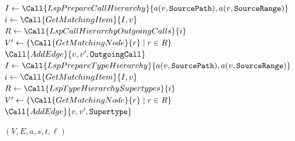 \documentclass{scrartcl}
\begin{document}
{\begin{algorithm}
\begin{algorithmic}[1]
        \State $I \gets \Call{LspPrepareCallHierarchy}{a(v, \texttt{SourcePath}), a(v, \texttt{SourceRange})}$
        \State $i \gets \Call{GetMatchingItem}{I, v}$
        \State $R \gets \Call{LspCallHierarchyOutgoingCalls}{i}$
        \State $V' \gets \{\Call{GetMatchingNode}{r} \mid r \in R\}$
          \State $\Call{AddEdge}{v, v', \texttt{OutgoingCall}}$
        \EndFor
        \State $I \gets \Call{LspPrepareTypeHierarchy}{a(v, \texttt{SourcePath}), a(v, \texttt{SourceRange})}$
        \State $i \gets \Call{GetMatchingItem}{I, v}$
        \State $R \gets \Call{LspTypeHierarchySupertypes}{i}$
        \State $V' \gets \{\Call{GetMatchingNode}{r} \mid r \in R\}$
          \State $\Call{AddEdge}{v, v', \texttt{Supertype}}$
        \EndFor
      \EndIf{}
    \EndFor


    \State \Return $(V, E, a, s, t, \ell)$

    \Statex
  \end{algorithmic}
\end{algorithm}

}
\end{document}

